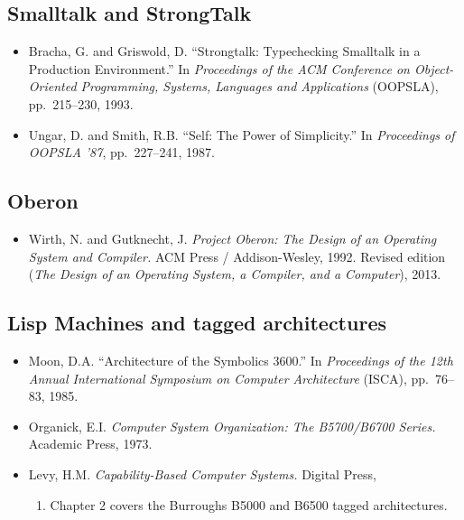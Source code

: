 \documentclass[
  12pt,
]{report}
\providecommand{\tightlist}{%
  \setlength{\itemsep}{0pt}\setlength{\parskip}{0pt}}
\begin{document}
\subsection{Smalltalk and StrongTalk}\label{smalltalk-and-strongtalk}

\begin{itemize}
\item
  Bracha, G. and Griswold, D. ``Strongtalk: Typechecking Smalltalk in a
  Production Environment.'' In \emph{Proceedings of the ACM Conference
  on Object-Oriented Programming, Systems, Languages and Applications}
  (OOPSLA), pp.~215--230, 1993.
\item
  Ungar, D. and Smith, R.B. ``Self: The Power of Simplicity.'' In
  \emph{Proceedings of OOPSLA '87}, pp.~227--241, 1987.
\end{itemize}

\subsection{Oberon}\label{oberon}

\begin{itemize}
\tightlist
\item
  Wirth, N. and Gutknecht, J. \emph{Project Oberon: The Design of an
  Operating System and Compiler.} ACM Press / Addison-Wesley, 1992.
  Revised edition (\emph{The Design of an Operating System, a Compiler,
  and a Computer}), 2013.
\end{itemize}

\subsection{Lisp Machines and tagged
architectures}\label{lisp-machines-and-tagged-architectures}

\begin{itemize}
\item
  Moon, D.A. ``Architecture of the Symbolics 3600.'' In
  \emph{Proceedings of the 12th Annual International Symposium on
  Computer Architecture} (ISCA), pp.~76--83, 1985.
\item
  Organick, E.I. \emph{Computer System Organization: The B5700/B6700
  Series.} Academic Press, 1973.
\item
  Levy, H.M. \emph{Capability-Based Computer Systems.} Digital Press,

  \begin{enumerate}
  \def\labelenumi{\arabic{enumi}.}
  \setcounter{enumi}{1983}
  \tightlist
  \item
    Chapter 2 covers the Burroughs B5000 and B6500 tagged architectures.
  \end{enumerate}
\end{itemize}
\end{document}

